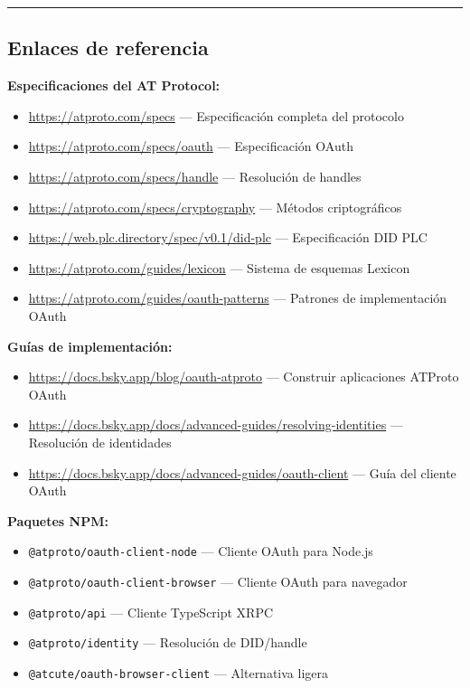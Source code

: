 \documentclass[10pt,letterpaper,twocolumn]{article}
\begin{document}

\vspace{0.5em}
\noindent\rule{\columnwidth}{0.5pt}

\subsection*{Enlaces de referencia}

\noindent\small

\textbf{Especificaciones del AT Protocol:}
\begin{itemize}
  \item \url{https://atproto.com/specs} --- Especificación completa del protocolo
  \item \url{https://atproto.com/specs/oauth} --- Especificación OAuth
  \item \url{https://atproto.com/specs/handle} --- Resolución de handles
  \item \url{https://atproto.com/specs/cryptography} --- Métodos criptográficos
  \item \url{https://web.plc.directory/spec/v0.1/did-plc} --- Especificación DID PLC
  \item \url{https://atproto.com/guides/lexicon} --- Sistema de esquemas Lexicon
  \item \url{https://atproto.com/guides/oauth-patterns} --- Patrones de implementación OAuth
\end{itemize}

\textbf{Guías de implementación:}
\begin{itemize}
  \item \url{https://docs.bsky.app/blog/oauth-atproto} --- Construir aplicaciones ATProto OAuth
  \item \url{https://docs.bsky.app/docs/advanced-guides/resolving-identities} --- Resolución de identidades
  \item \url{https://docs.bsky.app/docs/advanced-guides/oauth-client} --- Guía del cliente OAuth
\end{itemize}

\textbf{Paquetes NPM:}
\begin{itemize}
  \item \texttt{@atproto/oauth-client-node} --- Cliente OAuth para Node.js
  \item \texttt{@atproto/oauth-client-browser} --- Cliente OAuth para navegador
  \item \texttt{@atproto/api} --- Cliente TypeScript XRPC
  \item \texttt{@atproto/identity} --- Resolución de DID/handle
  \item \texttt{@atcute/oauth-browser-client} --- Alternativa ligera
\end{itemize}
\end{document}

